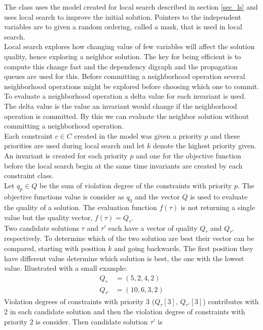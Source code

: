 The  class uses the model created for local search described in section \ref{sec_ls} and 
uses local search to improve the initial solution. Pointers to the independent variables are to given a random 
ordering, called a mask, that is used in local search.   \\ 
Local search explores how changing value of few variables will affect the solution quality, hence exploring a neighbor 
solution. The key for being efficient is to compute this change fast and the dependency digraph and the propagation 
queues are used for this. Before committing a neighborhood operation several neighborhood operations might be explored 
before choosing which one to commit. To evaluate a neighborhood operation a delta value for each invariant is used. The 
delta value is the value an invariant would change if the neighborhood operation is committed. By this we can evaluate 
the neighbor solution without committing a neighborhood operation. \\ 
Each constraint $c \in C$ created in the model was given a priority $p$ and these priorities are used during local 
search and let $k$ denote the highest priority given. An invariant is created for each priority $p$ and one for the 
objective function before the local search begin at the same time invariants are created by each constraint class. \\
Let $q_p \in Q$ be the sum of violation degree of the constraints with priority $p$. The objective functions 
value is consider as $q_0$ and the vector $Q$ is used to evaluate the quality of a solution. The evaluation function 
$f(\tau)$ is not returning a single value but the quality vector, $f(\tau) = Q_\tau$.  \\ 
Two candidate solutions $\tau$ and $\tau'$ each have a vector of quality $Q_\tau$ and $Q_{\tau'}$ respectively. To 
determine which of the two solution are best their vector can be compared, starting with position $k$ and going 
backwards. The first position they have different value determine which solution is best, the one with the lowest value. 
Illustrated with a small example:
\begin{align}
 Q_\tau &= (5,2,4,2) \\ 
 Q_{\tau'} &=(10,6,3,2) 
\end{align}
Violation degrees of constraints with priority 3 ($Q_\tau[3]$, $Q_{\tau'}[3]$) contributes with 2 in each candidate 
solution and then the violation degree of constraints with priority 2 is consider. Then candidate solution $\tau'$ is 
